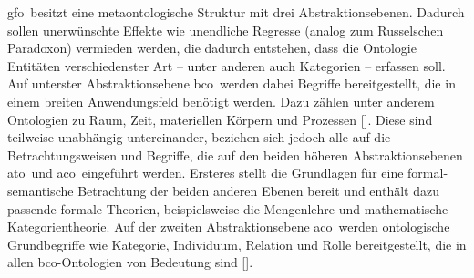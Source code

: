 
    \ac{gfo}\ besitzt
    eine metaontologische Struktur mit drei Abstraktionsebenen. 
    Dadurch sollen unerwünschte Effekte wie unendliche Regresse (analog zum Russelschen Paradoxon) vermieden werden, die dadurch entstehen, dass die Ontologie Entitäten verschiedenster Art -- unter anderen auch Kategorien -- erfassen soll.
    Auf unterster Abstraktionsebene \ac{bco}\ werden dabei Begriffe bereitgestellt, die in einem breiten Anwendungsfeld benötigt werden.
    Dazu zählen unter anderem Ontologien zu Raum, Zeit, materiellen Körpern und Prozessen
    [\cite{baumann-r-2014-171-a, baumann-r-2016-53-a}].
    Diese sind teilweise unabhängig untereinander, beziehen sich jedoch alle auf die Betrachtungsweisen und Begriffe, die auf den beiden höheren Abstraktionsebenen  \ac{ato}\ und \ac{aco}\ eingeführt werden.
    Ersteres stellt die Grundlagen für eine formal-semantische Betrachtung der beiden anderen Ebenen bereit und enthält dazu passende formale Theorien, beispielsweise die Mengenlehre und mathematische Kategorientheorie.
    Auf der zweiten Abstraktionsebene \ac{aco}\ werden ontologische Grundbegriffe wie Kategorie, Individuum, Relation und Rolle bereitgestellt, die in allen \ac{bco}-Ontologien von Bedeutung sind
    [\cite{loebe-f-2018--a}].

